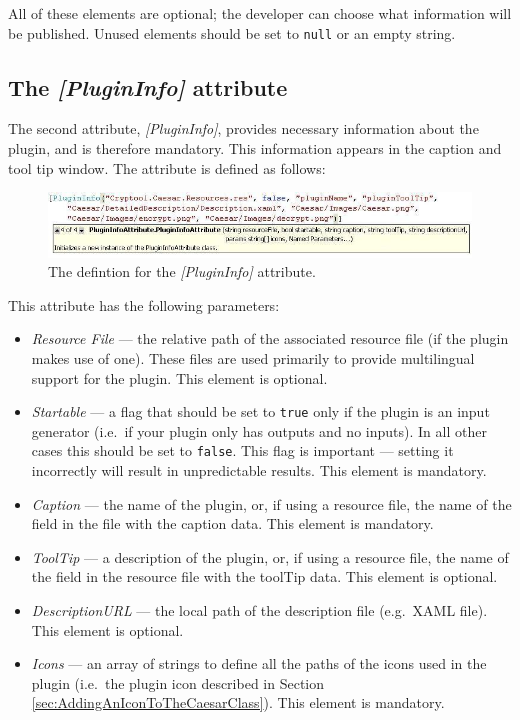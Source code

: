 All of these elements are optional; the developer can choose what information will be published. Unused elements should be set to \texttt{null} or an empty string.
\clearpage

\subsection{The \protect\textit{[PluginInfo]} attribute}
\label{sec:ThePluginInfoAttribute}

The second attribute, \textit{[PluginInfo]}, provides necessary information about the plugin, and is therefore mandatory. This information appears in the caption and tool tip window. The attribute is defined as follows:

\begin{figure}[h]
	\centering
		\includegraphics[width=1.00\textwidth]{figures/attribute_plugininfo.jpg}
	\caption{The defintion for the \textit{[PluginInfo]} attribute.}
	\label{fig:attribute_plugininfo}
\end{figure}

\noindent This attribute has the following parameters:

\begin{itemize}
	\item \textit{Resource File} --- the relative path of the associated resource file (if the plugin makes use of one). These files are used primarily to provide multilingual support for the plugin. This element is optional.
	\item \textit{Startable} --- a flag that should be set to \texttt{true} only if the plugin is an input generator (i.e.\ if your plugin only has outputs and no inputs). In all other cases this should be set to \texttt{false}. This flag is important --- setting it incorrectly will result in unpredictable results. This element is mandatory.
	\item \textit{Caption} --- the name of the plugin, or, if using a resource file, the name of the field in the file with the caption data. This element is mandatory.
	\item \textit{ToolTip} --- a description of the plugin, or, if using a resource file, the name of the field in the resource file with the toolTip data. This element is optional.
	\item \textit{DescriptionURL} --- the local path of the description file (e.g.\ XAML file). This element is optional.
	\item \textit{Icons} --- an array of strings to define all the paths of the icons used in the plugin (i.e.\ the plugin icon described in Section \ref{sec:AddingAnIconToTheCaesarClass}). This element is mandatory.
\end{itemize}

